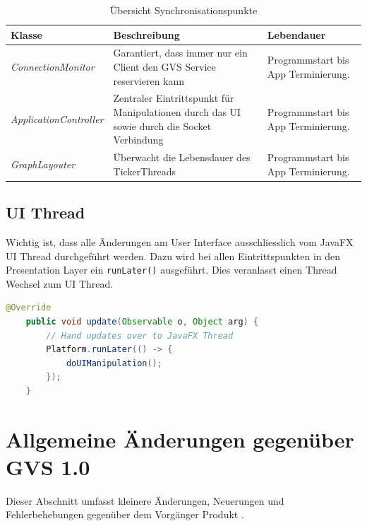 \documentclass[11pt,a4paper,english,oneside]{book}
\numberwithin{equation}{chapter}
\begin{document}
	\begin{table}[h!]
		\centering
		\begin{tabularx}{\linewidth}{l X X}
			\toprule 
			Klasse & Beschreibung & Lebendauer \\
			\midrule
			\textit{ConnectionMonitor} & Garantiert, dass immer nur ein Client den GVS Service reservieren kann & Programmstart bis App Terminierung. \\
			\textit{ApplicationController} & Zentraler Eintrittspunkt für Manipulationen durch das UI sowie durch die Socket Verbindung & Programmstart bis App Terminierung. \\
			\textit{GraphLayouter} & Überwacht die Lebensdauer des TickerThreads & Programmstart bis App Terminierung. \\
			\bottomrule 
		\end{tabularx} 
		\caption{Übersicht Synchronisationspunkte} 
	\end{table}

	\subsection{UI Thread}
	Wichtig ist, dass alle Änderungen am User Interface ausschliesslich vom JavaFX UI Thread durchgeführt werden. Dazu wird bei allen Eintrittspunkten in den Presentation Layer ein \lstinline|runLater()| ausgeführt. Dies veranlasst einen Thread Wechsel zum UI Thread. 
		
	\begin{lstlisting}[language=java, frame=single, caption={Java FX UI Thread}, label={code:uithread}]
	@Override
	public void update(Observable o, Object arg) {
		// Hand updates over to JavaFX Thread
		Platform.runLater(() -> {
			doUIManipulation();
		});
	}
	\end{lstlisting}
			
	\section{Allgemeine Änderungen gegenüber GVS 1.0}
	Dieser Abschnitt umfasst kleinere Änderungen, Neuerungen und Fehlerbehebungen gegenüber dem Vorgänger Produkt \cite{gvs1}. 
	
\end{document}
